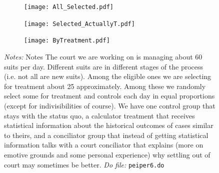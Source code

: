 \documentclass[11pt]{article}
\begin{document}
      
\begin{figure}[H]
\caption{Number of experimental cases: overall, selected and actually treated.}
\label{treatmentunits}
\begin{center}
    \begin{subfigure}{0.49\textwidth}
        \caption{}
        \centering
        \texttt{[image: All\_Selected.pdf]}
    \end{subfigure}
    \begin{subfigure}{0.49\textwidth}
        \caption{}
        \centering
        \texttt{[image: Selected\_ActuallyT.pdf]}
    \end{subfigure}
    \hfill
        \begin{subfigure}{0.49\textwidth}
            \caption{}
            \centering
            \texttt{[image: ByTreatment.pdf]}    
        \end{subfigure}
    \end{center}
     {\footnotesize \textit{Notes: } Notes 
    The court we are working on is managing about 60 suits per day. Different suits are in different stages of the process (i.e. not all are new suits). Among the eligible ones we are selecting for treatment about 25 approximately. Among these we randomly select some for treatment and controls each day in equal proportions (except for indivisibilities of course). We have one control group that stays with the status quo, a calculator treatment that receives statistical information about the historical outcomes of cases similar to theirs, and a conciliator group that instead of getting statistical information talks with a court conciliator that explains (more on emotive grounds and some personal experience) why settling out of court may sometimes be better.}
      {\footnotesize \textit{Do file: }  \texttt{peiper6.do}}
\end{figure}
\end{document}

